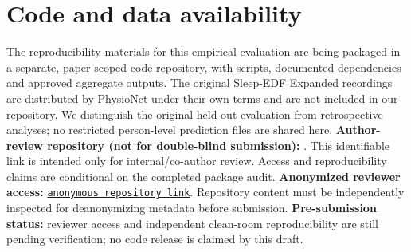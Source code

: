 \documentclass{article}
\begin{document}
\section{Code and data availability}
\label{app:code_access}
The reproducibility materials for this empirical evaluation are being packaged in a separate, paper-scoped code repository, with scripts, documented dependencies and approved aggregate outputs. The original Sleep-EDF Expanded recordings are distributed by PhysioNet under their own terms and are not included in our repository. We distinguish the original held-out evaluation from retrospective analyses; no restricted person-level prediction files are shared here.
\ifdefined\HEVALCodeAuthorURL
\textbf{Author-review repository (not for double-blind submission):} \href{\HEVALCodeAuthorURL}{\texttt{\HEVALCodeAuthorVisible}}. This identifiable link is intended only for internal/co-author review. Access and reproducibility claims are conditional on the completed package audit.
\else
\ifdefined\HEVALCodeBlindURL
\textbf{Anonymized reviewer access:} \href{\HEVALCodeBlindURL}{\texttt{anonymous repository link}}. Repository content must be independently inspected for deanonymizing metadata before submission.
\else
\textbf{Pre-submission status:} reviewer access and independent clean-room reproducibility are still pending verification; no code release is claimed by this draft.
\fi
\fi

\newpage

\end{document}

